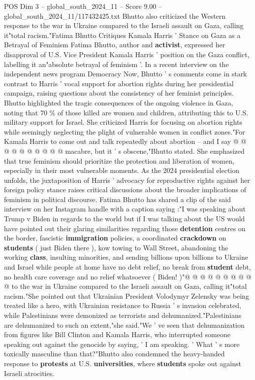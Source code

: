 \begin{textsample}{POS Dim 3 – global\_south\_2024\_11 – Score 9.00 – global\_south\_2024\_11/117432425.txt}  \label{ex:f3_pos_325}
Bhutto also criticized the Western response to the war in Ukraine compared to the Israeli assault on Gaza, calling it"total racism."Fatima Bhutto Critiques Kamala Harris ' Stance on Gaza as a Betrayal of Feminism Fatima Bhutto, author and \textbf{activist}, expressed her disapproval of U.S.
Vice President Kamala Harris ' position on the Gaza conflict, labelling it an"absolute betrayal of feminism '.
In a recent interview on the independent news program Democracy Now, Bhutto ' s comments come in stark contrast to Harris ' vocal support for abortion rights during her presidential campaign, raising questions about the consistency of her feminist principles.
Bhutto highlighted the tragic consequences of the ongoing violence in Gaza, noting that 70 \% of those killed are women and children, attributing this to U.S. military support for Israel.
She criticized Harris for focusing on abortion rights while seemingly neglecting the plight of vulnerable women in conflict zones."For Kamala Harris to come out and talk repeatedly about abortion -- and I say @ @ @ @ @ @ @ @ @ @ macabre, but it ' s obscene,"Bhutto stated.
She emphasized that true feminism should prioritize the protection and liberation of women, especially in their most vulnerable moments.
As the 2024 presidential election unfolds, the juxtaposition of Harris ' advocacy for reproductive rights against her foreign policy stance raises critical discussions about the broader implications of feminism in political discourse.
Fatima Bhutto has shared a clip of the said interview on her Instagram handle with a caption saying :"I was speaking about Trump v Biden in regards to the world but if I was talking about the US would have pointed out their glaring similarities regarding those \textbf{detention} centres on the border, fascistic \textbf{immigration} policies, a coordinated \textbf{crackdown} on \textbf{students} ( just Biden there ), kow towing to Wall Street, abandoning the working \textbf{class}, insulting minorities, and sending billions upon billions to Ukraine and Israel while people at home have no debt relief, no break from \textbf{student} debt, no health care coverage and no relief whatsoever ( Biden! )"@ @ @ @ @ @ @ @ @ @ to the war in Ukraine compared to the Israeli assault on Gaza, calling it"total racism."She pointed out that Ukrainian President Volodymyr Zelensky was being treated like a hero, with Ukrainian resistance to Russia ' s invasion celebrated, while Palestinians were demonized as terrorists and dehumanized."Palestinians are dehumanized to such an extent,"she said."We ' ve seen that dehumanization from figures like Bill Clinton and Kamala Harris, who interrupted someone speaking out against the genocide by saying, ' I am speaking. ' What ' s more toxically masculine than that?"Bhutto also condemned the heavy-handed response to \textbf{protests} at U.S. \textbf{universities}, where \textbf{students} spoke out against Israeli atrocities.

\end{textsample}
